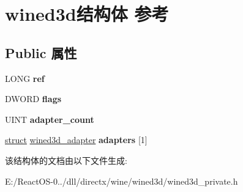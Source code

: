 \hypertarget{structwined3d}{}\section{wined3d结构体 参考}
\label{structwined3d}
\subsection*{Public 属性}
\begin{DoxyCompactItemize}
\item 
\mbox{\label{structwined3d_a74db7ddc58be2c80394e1a7219cbaf17}} 
L\+O\+NG {\bfseries ref}
\item 
\mbox{\label{structwined3d_a7544e8a2a1480fe35c21b29f704ff9d8}} 
D\+W\+O\+RD {\bfseries flags}
\item 
\mbox{\label{structwined3d_ad329f06a2f90bdb24c2e7f7a083c450a}} 
U\+I\+NT {\bfseries adapter\+\_\+count}
\item 
\mbox{\label{structwined3d_ae43752941b1637ba6a6615bcd0efe19d}} 
\hyperlink{interfacestruct}{struct} \hyperlink{structwined3d__adapter}{wined3d\+\_\+adapter} {\bfseries adapters} \mbox{[}1\mbox{]}
\end{DoxyCompactItemize}


该结构体的文档由以下文件生成\+:\begin{DoxyCompactItemize}
\item 
E\+:/\+React\+O\+S-\/0../dll/directx/wine/wined3d/wined3d\+\_\+private.\+h\end{DoxyCompactItemize}
